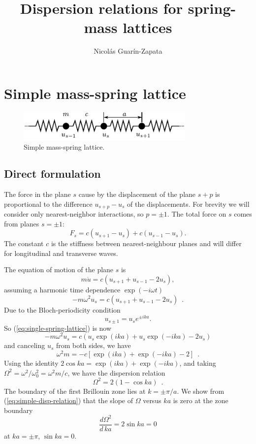 \documentclass[12pt]{article}
\title{\textbf{Dispersion relations for spring-mass lattices}}
\author{Nicolás Guarín-Zapata}
\begin{document}
\maketitle


\section{Simple mass-spring lattice}
\begin{figure}[h]
\centering
\includegraphics[height=1.5cm]{img/spring-mass.pdf} 
\caption{Simple mass-spring lattice.}
\end{figure}
\subsection{Direct formulation}
The force in the plane $s$ cause by the displacement of the plane $s+p$ is proportional to the difference $u_{s+p}-u_s$ of the displacements. For brevity we will consider only nearest-neighbor interactions, so $p=\pm 1$. The total force on $s$ comes from planes $s=\pm 1$:
\begin{equation}
F_s = c(u_{s+1}-u_s)+ c(u_{s-1}-u_s).
\end{equation}
The constant $c$ is the stiffness between nearest-neighbour planes and will differ for longitudinal and transverse waves.

The equation of motion of the plane $s$ is
\[ m  \ddot{u} = c(u_{s+1} + u_{s-1} -2 u_s), \]
assuming a harmonic time dependence $\exp(-i\omega t)$
\begin{equation}
-m\omega^2 u_s = c(u_{s+1} + u_{s-1} - 2u_s) \enspace .
\label{eq:single-spring-lattice}
\end{equation}
Due to the Bloch-periodicity condition
\[u_{s\pm 1} = u_s e^{\pm i ka}. \]
So (\ref{eq:single-spring-lattice}) is now
\[ -m \omega^2 u_s = c (u_s \exp(ika) + u_s \exp(-ika) - 2u_s) \]
and canceling $u_s$ from both sides, we have
\[ \omega^2 m = -c[ \exp(ika) + \exp(-ika) - 2 ] \enspace .\]
Using the identity $2\cos ka = \exp(ika) + \exp(-ika)$, and taking $\Omega^2 = \omega^2/\omega_0^2 = \omega^2 m/c$, we have the dispersion relation
\begin{equation}
\Omega^2 = 2 (1-\cos ka) \enspace .
\label{eq:simple-disp-relation}
\end{equation}
The boundary of the first Brillouin zone lies at $k=\pm \pi/a$. We show from (\ref{eq:simple-disp-relation}) that the slope of $\Omega$ versus $ka$ is zero at the zone boundary
\[ \frac{d\Omega^2}{d\, ka} = 2\sin ka=0\]
at $ka=\pm \pi$, $\sin ka = 0$.
\end{document}
